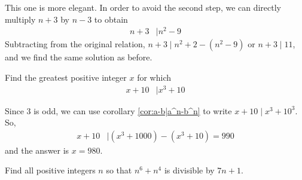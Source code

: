 \documentclass{subfile}
\begin{document}
		\begin{solution}
			This one is more elegant. In order to avoid the second step, we can directly multiply $n+3$ by $n-3$ to obtain
			\begin{align*}
				n+3
					& \mid n^2-9
			\end{align*}
			Subtracting from the original relation, $n+3 \mid n^2+2-(n^2-9)$ or $n+3\mid 11$, and we find the same solution as before.
		\end{solution}

		\begin{problem}
			Find the greatest positive integer $x$ for which
				\begin{align*}
					x+10
						& \mid x^3+10
				\end{align*}
		\end{problem}

		\begin{solution}
			Since $3$ is odd, we can use corollary \eqref{cor:a-b|a^n-b^n} to write $x+10 \mid x^3+10^3$. So,
				\begin{align*}
					x+10
						& \mid (x^3+1000)-(x^3+10)=990
				\end{align*}
			and the answer is $x=980$.
		\end{solution}

		\begin{problem}
			Find all positive integers $n$ so that $n^6+n^4$ is divisible by $7n+1$.
		\end{problem}
\end{document}
